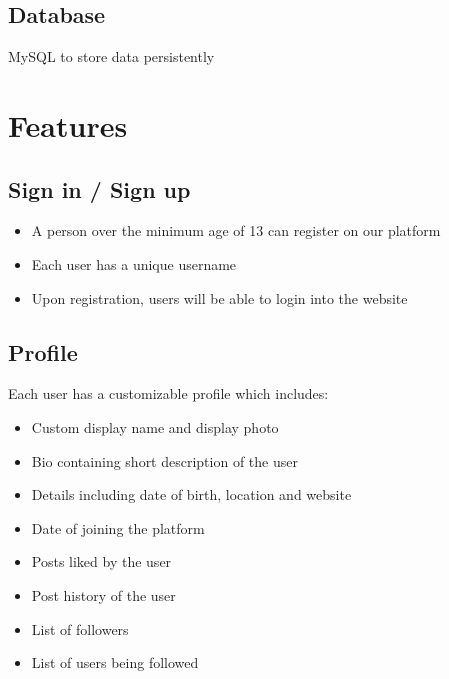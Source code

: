 \documentclass[journal,12pt,onecolumn]{IEEEtran}
\begin{document}
\subsection*{\textbf{Database}} MySQL to store data persistently

\section*{\textbf{Features}} 
\subsection*{\textbf{Sign in / Sign up}}
\begin{itemize}
    \item A person over the minimum age of 13 can register on our platform 
    \item Each user has a unique username
    \item Upon registration, users will be able to login into the website
\end{itemize}
%
\subsection*{\textbf{Profile}}
\noindent Each user has a customizable profile which includes:
\begin{itemize}
    \item Custom display name and display photo
    \item Bio containing short description of the user
    \item Details including date of birth, location and website
    \item Date of joining the platform
    \item Posts liked by the user
    \item Post history of the user
    \item List of followers
    \item List of users being followed
\end{itemize}
%
\end{document}
